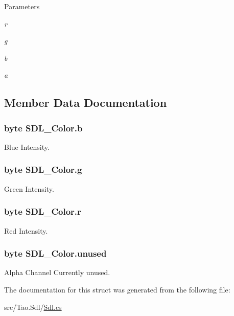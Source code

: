 \begin{DoxyParams}{Parameters}
\item[{\em r}]\item[{\em g}]\item[{\em b}]\item[{\em a}]\end{DoxyParams}


\subsection{Member Data Documentation}
\hypertarget{struct_s_d_l___color_afcab9cae0bb36b286b472fd2d90f9ea5}{
\subsubsection[{b}]{\setlength{\rightskip}{0pt plus 5cm}byte {\bf SDL\_\-Color.b}}}
\label{struct_s_d_l___color_afcab9cae0bb36b286b472fd2d90f9ea5}


Blue Intensity. 

\hypertarget{struct_s_d_l___color_a00e502b139916cdd32418c00c6d3af96}{
\subsubsection[{g}]{\setlength{\rightskip}{0pt plus 5cm}byte {\bf SDL\_\-Color.g}}}
\label{struct_s_d_l___color_a00e502b139916cdd32418c00c6d3af96}


Green Intensity. 

\hypertarget{struct_s_d_l___color_a6b604b87f66fec29eb97d00dae9cb83d}{
\subsubsection[{r}]{\setlength{\rightskip}{0pt plus 5cm}byte {\bf SDL\_\-Color.r}}}
\label{struct_s_d_l___color_a6b604b87f66fec29eb97d00dae9cb83d}


Red Intensity. 

\hypertarget{struct_s_d_l___color_ae5fb155439a0f95e8c58d44a40474081}{
\subsubsection[{unused}]{\setlength{\rightskip}{0pt plus 5cm}byte {\bf SDL\_\-Color.unused}}}
\label{struct_s_d_l___color_ae5fb155439a0f95e8c58d44a40474081}


Alpha Channel Currently unused. 



The documentation for this struct was generated from the following file:\begin{DoxyCompactItemize}
\item 
src/Tao.Sdl/\hyperlink{_sdl_8cs}{Sdl.cs}\end{DoxyCompactItemize}
